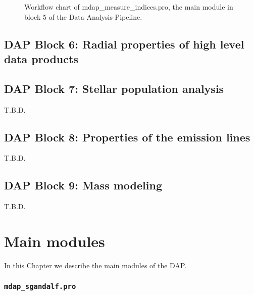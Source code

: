 \documentclass[11pt]{book}
\begin{document}
\begin{figure}
\begin{center}
\caption{Workflow chart of mdap\_measure\_indices.pro, the main module in block 5 of the Data Analysis Pipeline.}
 \label{dap_fig:block5}
\end{center}
\end{figure}



\section{DAP Block 6: Radial properties of high level data products}
\label{dap_sec:block6}

\section{DAP Block 7: Stellar population analysis}
\label{dap_sec:block7}
T.B.D.

\section{DAP Block 8: Properties of the emission lines}
\label{dap_sec:block8}
T.B.D.

\section{DAP Block 9: Mass modeling}
\label{dap_sec:block9}
T.B.D.


\chapter{Main modules}
\label{dap_chap:dap_modules}

In this Chapter we describe the main modules of the DAP.








\subsection{{\tt mdap\_sgandalf.pro}}
\label{dap_sec:mdap_sgandalf}
\end{document}
